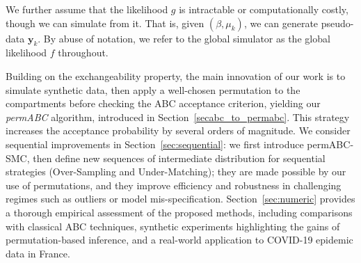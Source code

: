 \documentclass[lineno]{biometrika}
\def\globparam{\beta}
\def\locparam{\mu}
\def\obsdata{\mathbf{y}}
\def\rr#1{\textcolor{teal}{\textit{// RR: #1}}}
\begin{document}
We further assume that the likelihood $g$ is intractable or computationally costly, though we can simulate from it. That is, given $(\globparam,\locparam_k)$, we can generate pseudo-data $\obsdata_k$. By abuse of notation, we refer to the global simulator as the global likelihood $f$ throughout.


Building on the exchangeability property, the main innovation of our work is to simulate synthetic data, then apply a well-chosen permutation to the compartments before checking the ABC acceptance criterion, yielding our \emph{permABC} algorithm, introduced in Section~\ref{secabc_to_permabc}. This strategy increases the acceptance probability by several orders of magnitude. 
We consider sequential improvements in Section~\ref{sec:sequential}: we first introduce permABC-SMC, then  define new sequences of intermediate distribution for sequential strategies (Over-Sampling and Under-Matching); they are made possible by our use of permutations, and they improve efficiency and robustness in challenging regimes such as outliers or model mis-specification. Section~\ref{sec:numeric} provides a thorough empirical assessment of the proposed methods, including comparisons with classical ABC techniques, synthetic experiments highlighting the gains of permutation-based inference, and a real-world application to COVID-19 epidemic data in France.
\end{document}
